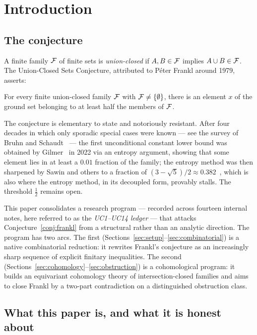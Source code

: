 \section{Introduction}
\label{sec:intro}

\subsection{The conjecture}
\label{ssec:conjecture}

A finite family $\mathcal{F}$ of finite sets is \emph{union-closed} if
$A,B\in\mathcal{F}$ implies $A\cup B\in\mathcal{F}$. The Union-Closed Sets Conjecture,
attributed to Péter Frankl around 1979, asserts:

\begin{conjecture}
\label{conj:frankl}
For every finite union-closed family $\mathcal{F}$ with $\mathcal{F}\neq\{\emptyset\}$,
there is an element $x$ of the ground set belonging to at least half
the members of $\mathcal{F}$.
\end{conjecture}

The conjecture is elementary to state and notoriously resistant. After
four decades in which only sporadic special cases were known --- see
the survey of Bruhn and Schaudt~\cite{bruhn-schaudt} --- the first
unconditional constant lower bound was obtained by
Gilmer~\cite{gilmer} in 2022 via an entropy argument, showing that some
element lies in at least a $0.01$ fraction of the family; the entropy
method was then sharpened by Sawin and others to a fraction of
$(3-\sqrt5)/2\approx0.382$~\cite{sawin}, which is also where the
entropy method, in its decoupled form, provably stalls. The threshold
$\tfrac12$ remains open.

This paper consolidates a research program --- recorded across fourteen
internal notes, here referred to as the \emph{UC1--UC14 ledger} --- that
attacks Conjecture~\ref{conj:frankl} from a structural rather than an
analytic direction. The program has two arcs. The first
(Sections~\ref{sec:setup}--\ref{sec:combinatorial}) is a native
combinatorial reduction: it rewrites Frankl's conjecture as an
increasingly sharp sequence of explicit finitary inequalities. The
second (Sections~\ref{sec:cohomology}--\ref{sec:obstruction}) is a
cohomological program: it builds an equivariant cohomology theory of
intersection-closed families and aims to close Frankl by a two-part
contradiction on a distinguished obstruction class.

\subsection{What this paper is, and what it is honest about}
\label{ssec:honesty}


